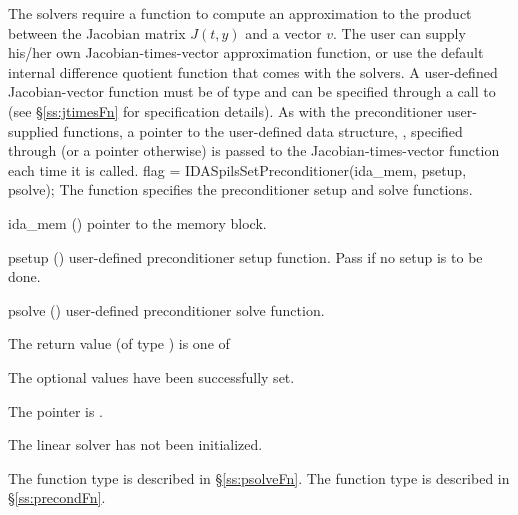 {
The {\idaspils} solvers require a function to compute an approximation to the
product between the Jacobian matrix $J(t,y)$ and a vector $v$.
The user can supply his/her own Jacobian-times-vector approximation function, 
or use the default internal difference quotient function
that comes with the {\idaspils} solvers.
A user-defined Jacobian-vector function must be of type 
and can be specified through a call to 
(see \S\ref{ss:jtimesFn} for specification details).
As with the preconditioner user-supplied functions,
a pointer to the user-defined data structure, , specified through
 (or a  pointer otherwise) is passed to the 
Jacobian-times-vector function  each time it is called.  
{
  flag = IDASpilsSetPreconditioner(ida\_mem, psetup, psolve);
}
{
  The function  specifies the preconditioner
  setup and solve functions.
}
{
  \begin{args}
  \item[ida\_mem] ()
    pointer to the {\idas} memory block.
  \item[psetup] ()
    user-defined preconditioner setup function.  Pass  if no
    setup is to be done.
  \item[psolve] ()
    user-defined preconditioner solve function.
  \end{args}
}
{
  The return value  (of type ) is one of
  \begin{args}
  \item[\Id{IDASPILS\_SUCCESS}] 
    The optional values have been successfully set.
  \item[\Id{IDASPILS\_MEM\_NULL}]
    The  pointer is .
  \item[\Id{IDASPILS\_LMEM\_NULL}]
    The {\idaspils} linear solver has not been initialized.
  \end{args}
}
{
   The function type  is described in \S\ref{ss:psolveFn}.
   The function type  is described in \S\ref{ss:precondFn}.
}}
